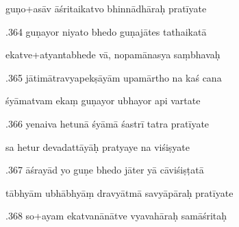 \documentclass[article,12pt,a4paper]{memoir}%
\newcounter{parCount}
\begin{document}
	  
	  \pstart \leavevmode%
	guṇo+asāv āśritaikatvo bhinnādhāraḥ pratīyate 
	{}
	\pend%
      

	  
	  \pstart {}.364 guṇayor niyato bhedo guṇajātes tathaikatā 
	{}
	\pend%
      

	  
	  \pstart \leavevmode%
	ekatve+atyantabhede vā, nopamānasya saṃbhavaḥ 
	{}
	\pend%
      

	  
	  \pstart {}.365 jātimātravyapekṣāyām upamārtho na kaś cana 
	{}
	\pend%
      

	  
	  \pstart \leavevmode%
	śyāmatvam ekaṃ guṇayor ubhayor api vartate 
	{}
	\pend%
      

	  
	  \pstart {}.366 yenaiva hetunā śyāmā śastrī tatra pratīyate 
	{}
	\pend%
      

	  
	  \pstart \leavevmode%
	sa hetur devadattāyāḥ pratyaye na viśiṣyate 
	{}
	\pend%
      

	  
	  \pstart {}.367 āśrayād yo guṇe bhedo jāter yā cāviśiṣṭatā 
	{}
	\pend%
      

	  
	  \pstart \leavevmode%
	tābhyām ubhābhyāṃ dravyātmā savyāpāraḥ pratīyate 
	{}
	\pend%
      

	  
	  \pstart {}.368 so+ayam ekatvanānātve vyavahāraḥ samāśritaḥ 
	{}
	\pend%
      
\end{document}

